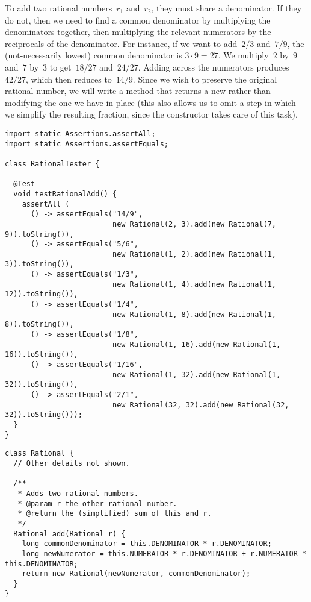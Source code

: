 To add two rational numbers~$r_1$ and~$r_2$, they must share a denominator. 
If they do not, then we need to find a common denominator by multiplying the denominators together, then multiplying the relevant numerators by the reciprocals of the denominator. 
For instance, if we want to add~$2/3$ and~$7/9$, the (not-necessarily lowest) common denominator is $3\cdot{9} = 27$. 
We multiply~$2$ by~$9$ and~$7$ by~$3$ to get~$18/27$ and~$24/27$. 
Adding across the numerators produces~$42/27$, which then reduces to~$14/9$. 
Since we wish to preserve the original rational number, we will write a method that returns a new  rather than modifying the one we have in-place (this also allows us to omit a step in which we simplify the resulting fraction, since the constructor takes care of this task).

\enlargethispage{1\baselineskip}
\begin{lstlisting}[language=MyJava]
import static Assertions.assertAll;
import static Assertions.assertEquals;

class RationalTester {

  @Test
  void testRationalAdd() {
    assertAll (
      () -> assertEquals("14/9", 
                         new Rational(2, 3).add(new Rational(7, 9)).toString()),
      () -> assertEquals("5/6", 
                         new Rational(1, 2).add(new Rational(1, 3)).toString()),
      () -> assertEquals("1/3", 
                         new Rational(1, 4).add(new Rational(1, 12)).toString()),
      () -> assertEquals("1/4", 
                         new Rational(1, 8).add(new Rational(1, 8)).toString()),
      () -> assertEquals("1/8", 
                         new Rational(1, 16).add(new Rational(1, 16)).toString()),
      () -> assertEquals("1/16", 
                         new Rational(1, 32).add(new Rational(1, 32)).toString()),
      () -> assertEquals("2/1", 
                         new Rational(32, 32).add(new Rational(32, 32)).toString()));
  }
}
\end{lstlisting}

\begin{lstlisting}[language=MyJava]
class Rational {
  // Other details not shown.

  /**
   * Adds two rational numbers.
   * @param r the other rational number.
   * @return the (simplified) sum of this and r.
   */
  Rational add(Rational r) {
    long commonDenominator = this.DENOMINATOR * r.DENOMINATOR;
    long newNumerator = this.NUMERATOR * r.DENOMINATOR + r.NUMERATOR * this.DENOMINATOR;
    return new Rational(newNumerator, commonDenominator);
  }
}
\end{lstlisting}

